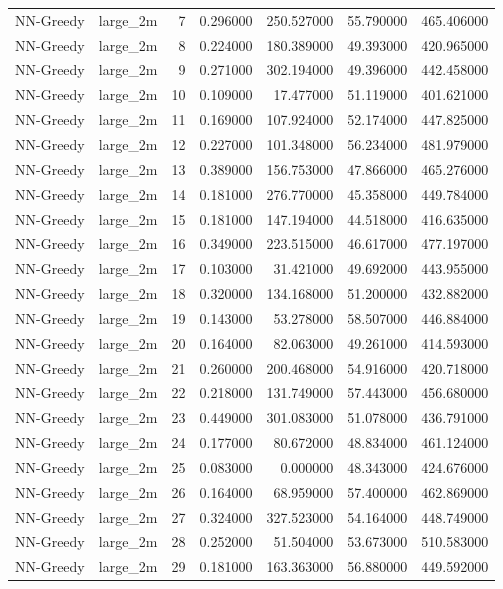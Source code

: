 \begin{tabular}{llrrrrr}
NN-Greedy & large_2m & 7 & 0.296000 & 250.527000 & 55.790000 & 465.406000 \\
NN-Greedy & large_2m & 8 & 0.224000 & 180.389000 & 49.393000 & 420.965000 \\
NN-Greedy & large_2m & 9 & 0.271000 & 302.194000 & 49.396000 & 442.458000 \\
NN-Greedy & large_2m & 10 & 0.109000 & 17.477000 & 51.119000 & 401.621000 \\
NN-Greedy & large_2m & 11 & 0.169000 & 107.924000 & 52.174000 & 447.825000 \\
NN-Greedy & large_2m & 12 & 0.227000 & 101.348000 & 56.234000 & 481.979000 \\
NN-Greedy & large_2m & 13 & 0.389000 & 156.753000 & 47.866000 & 465.276000 \\
NN-Greedy & large_2m & 14 & 0.181000 & 276.770000 & 45.358000 & 449.784000 \\
NN-Greedy & large_2m & 15 & 0.181000 & 147.194000 & 44.518000 & 416.635000 \\
NN-Greedy & large_2m & 16 & 0.349000 & 223.515000 & 46.617000 & 477.197000 \\
NN-Greedy & large_2m & 17 & 0.103000 & 31.421000 & 49.692000 & 443.955000 \\
NN-Greedy & large_2m & 18 & 0.320000 & 134.168000 & 51.200000 & 432.882000 \\
NN-Greedy & large_2m & 19 & 0.143000 & 53.278000 & 58.507000 & 446.884000 \\
NN-Greedy & large_2m & 20 & 0.164000 & 82.063000 & 49.261000 & 414.593000 \\
NN-Greedy & large_2m & 21 & 0.260000 & 200.468000 & 54.916000 & 420.718000 \\
NN-Greedy & large_2m & 22 & 0.218000 & 131.749000 & 57.443000 & 456.680000 \\
NN-Greedy & large_2m & 23 & 0.449000 & 301.083000 & 51.078000 & 436.791000 \\
NN-Greedy & large_2m & 24 & 0.177000 & 80.672000 & 48.834000 & 461.124000 \\
NN-Greedy & large_2m & 25 & 0.083000 & 0.000000 & 48.343000 & 424.676000 \\
NN-Greedy & large_2m & 26 & 0.164000 & 68.959000 & 57.400000 & 462.869000 \\
NN-Greedy & large_2m & 27 & 0.324000 & 327.523000 & 54.164000 & 448.749000 \\
NN-Greedy & large_2m & 28 & 0.252000 & 51.504000 & 53.673000 & 510.583000 \\
NN-Greedy & large_2m & 29 & 0.181000 & 163.363000 & 56.880000 & 449.592000 \\

\end{tabular}
